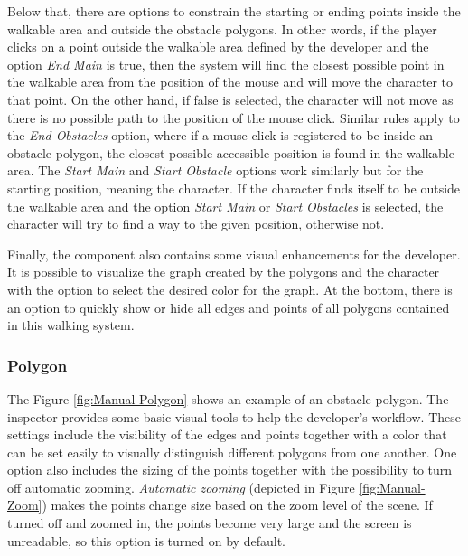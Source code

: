 Below that, there are options to constrain the starting or ending points inside the walkable area and outside the obstacle polygons. In other words, if the player clicks on a point outside the walkable area defined by the developer and the option \textit{End Main} is true, then the system will find the closest possible point in the walkable area from the position of the mouse and will move the character to that point. On the other hand, if false is selected, the character will not move as there is no possible path to the position of the mouse click. Similar rules apply to the \textit{End Obstacles} option, where if a mouse click is registered to be inside an obstacle polygon, the closest possible accessible position is found in the walkable area. The \textit{Start Main} and \textit{Start Obstacle} options work similarly but for the starting position, meaning the character. If the character finds itself to be outside the walkable area and the option \textit{Start Main} or \textit{Start Obstacles} is selected, the character will try to find a way to the given position, otherwise not.

Finally, the component also contains some visual enhancements for the developer. It is possible to visualize the graph created by the polygons and the character with the option to select the desired color for the graph. At the bottom, there is an option to quickly show or hide all edges and points of all polygons contained in this walking system. 

\subsubsection{Polygon}
\label{Manual:Polygon}
The Figure \ref{fig:Manual-Polygon} shows an example of an obstacle polygon. The inspector provides some basic visual tools to help the developer's workflow. These settings include the visibility of the edges and points together with a color that can be set easily to visually distinguish different polygons from one another. One option also includes the sizing of the points together with the possibility to turn off automatic zooming. \textit{Automatic zooming} (depicted in Figure \ref{fig:Manual-Zoom}) makes the points change size based on the zoom level of the scene. If turned off and zoomed in, the points become very large and the screen is unreadable, so this option is turned on by default.

